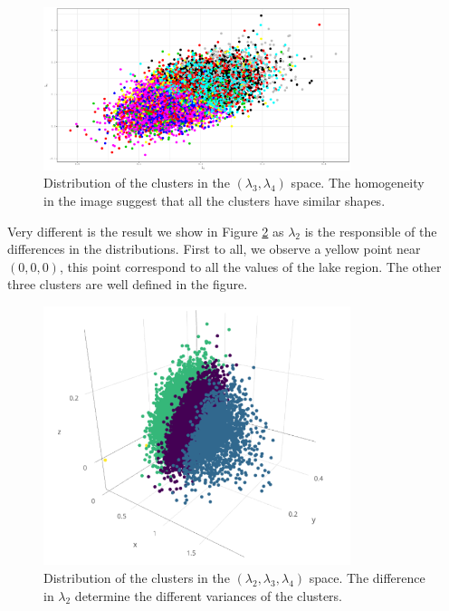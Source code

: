 \begin{figure}[H]
    \centering
    \includegraphics[width=0.8\textwidth]{img/use_cases/spus/clustersl3l4_4.eps}
    \caption{Distribution of the clusters in the $(\lambda_{3}, \lambda_{4})$ space. The homogeneity in the image suggest that all the clusters have similar shapes.}
    \label{fig:l3l4_suq2}
\end{figure}

Very different is the result we show in Figure \ref{fig:l2l3l4_suq2} as $\lambda_{2}$ is the responsible of the differences in the distributions. First to all, we observe a yellow point near $(0, 0, 0)$, this point correspond to all the values of the lake region. The other three clusters are well defined in the figure.

\begin{figure}[H]
    \centering
    \includegraphics[width=0.8\textwidth]{img/use_cases/spus/clustersl2l3l4.png}
    \caption{Distribution of the clusters in the $(\lambda_{2}, \lambda_{3}, \lambda_{4})$ space. The difference in $\lambda_{2}$ determine the different variances of the clusters.}
    \label{fig:l2l3l4_suq2}
\end{figure}


